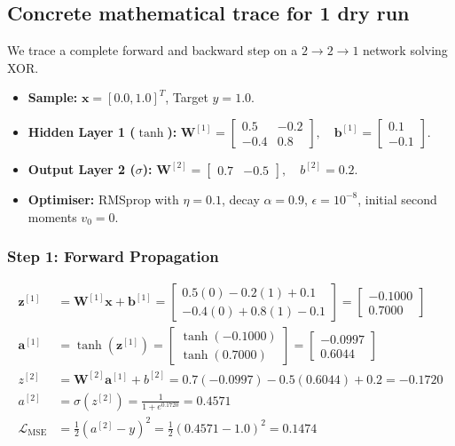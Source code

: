 \documentclass[11pt,a4paper]{article}
\begin{document}
\subsection{Concrete mathematical trace for 1 dry run}
We trace a complete forward and backward step on a $2 \to 2 \to 1$ network solving XOR.
\begin{itemize}[itemsep=1pt]
    \item \textbf{Sample:} $\mathbf{x} = [0.0, 1.0]^T$, Target $y = 1.0$.
    \item \textbf{Hidden Layer 1 ($\tanh$):}
    $\mathbf{W}^{[1]} = \begin{bmatrix} 0.5 & -0.2 \\ -0.4 & 0.8 \end{bmatrix}, \quad \mathbf{b}^{[1]} = \begin{bmatrix} 0.1 \\ -0.1 \end{bmatrix}$.
    \item \textbf{Output Layer 2 ($\sigma$):}
    $\mathbf{W}^{[2]} = \begin{bmatrix} 0.7 & -0.5 \end{bmatrix}, \quad b^{[2]} = 0.2$.
    \item \textbf{Optimiser:} RMSprop with $\eta = 0.1$, decay $\alpha = 0.9$, $\epsilon = 10^{-8}$, initial second moments $v_0 = 0$.
\end{itemize}

\subsubsection{Step 1: Forward Propagation}
\begin{align*}
    \mathbf{z}^{[1]} &= \mathbf{W}^{[1]} \mathbf{x} + \mathbf{b}^{[1]} = \begin{bmatrix} 0.5(0) - 0.2(1) + 0.1 \\ -0.4(0) + 0.8(1) - 0.1 \end{bmatrix} = \begin{bmatrix} -0.1000 \\ 0.7000 \end{bmatrix} \\
    \mathbf{a}^{[1]} &= \tanh(\mathbf{z}^{[1]}) = \begin{bmatrix} \tanh(-0.1000) \\ \tanh(0.7000) \end{bmatrix} = \begin{bmatrix} -0.0997 \\ 0.6044 \end{bmatrix} \\
    z^{[2]} &= \mathbf{W}^{[2]} \mathbf{a}^{[1]} + b^{[2]} = 0.7(-0.0997) - 0.5(0.6044) + 0.2 = -0.1720 \\
    a^{[2]} &= \sigma(z^{[2]}) = \frac{1}{1 + e^{0.1720}} = 0.4571 \\
    \mathcal{L}_{\text{MSE}} &= \frac{1}{2}(a^{[2]} - y)^2 = \frac{1}{2}(0.4571 - 1.0)^2 = 0.1474
\end{align*}
\end{document}
